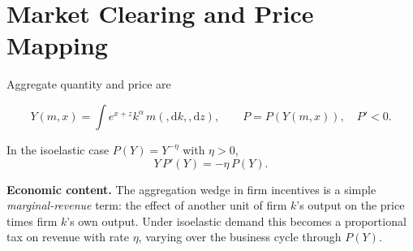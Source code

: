 \documentclass[11pt,letterpaper,oneside]{article}
\numberwithin{equation}{section}
\newcommand{\1}{\mathbf{1}}
\newcommand{\diff}{,\mathrm{d}}
\begin{document}
\section{Market Clearing and Price Mapping}
Aggregate quantity and price are

$$
Y(m,x)=\int e^{x+z}k^\alpha\,m(\diff k,\diff z),\qquad P=P(Y(m,x)),\quad P'<0.
$$

In the isoelastic case $P(Y)=Y^{-\eta}$ with $\eta>0$,
\begin{equation}\label{eq:isoelastic}
Y\,P'(Y) = -\eta\, P(Y).
\end{equation}

\begin{tcolorbox}[didacticstyle]
\textbf{Economic content.} The aggregation wedge in firm incentives is a simple \emph{marginal-revenue} term: the effect of another unit of firm $k$'s output on the price times firm $k$'s own output. Under isoelastic demand this becomes a proportional tax on revenue with rate $\eta$, varying over the business cycle through $P(Y)$.
\end{tcolorbox}

\end{document}
